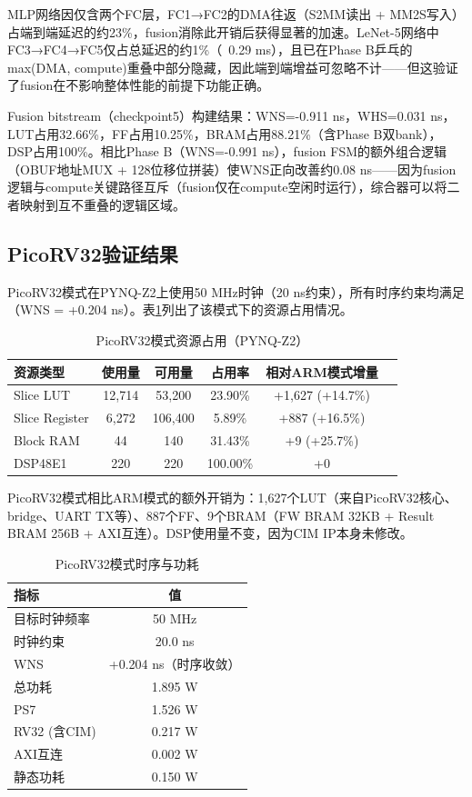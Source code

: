 \documentclass[12pt, a4paper]{article}
\begin{document}
MLP网络因仅含两个FC层，FC1→FC2的DMA往返（S2MM读出 + MM2S写入）占端到端延迟的约23\%，fusion消除此开销后获得显著的加速。LeNet-5网络中FC3→FC4→FC5仅占总延迟的约1\%（~0.29 ms），且已在Phase B乒乓的max(DMA, compute)重叠中部分隐藏，因此端到端增益可忽略不计——但这验证了fusion在不影响整体性能的前提下功能正确。

Fusion bitstream（checkpoint5）构建结果：WNS=-0.911 ns，WHS=0.031 ns，LUT占用32.66\%，FF占用10.25\%，BRAM占用88.21\%（含Phase B双bank），DSP占用100\%。相比Phase B（WNS=-0.991 ns），fusion FSM的额外组合逻辑（OBUF地址MUX + 128位移位拼装）使WNS正向改善约0.08 ns——因为fusion逻辑与compute关键路径互斥（fusion仅在compute空闲时运行），综合器可以将二者映射到互不重叠的逻辑区域。

\subsection{PicoRV32验证结果}

PicoRV32模式在PYNQ-Z2上使用50 MHz时钟（20 ns约束），所有时序约束均满足（WNS = +0.204 ns）。表\ref{tab:util_rv32}列出了该模式下的资源占用情况。

\begin{table}[H]
	\centering
	\caption{PicoRV32模式资源占用（PYNQ-Z2）}
	\begin{tabular}{lccccc}
		\toprule
		资源类型 & 使用量 & 可用量 & 占用率 & 相对ARM模式增量 \\
		\midrule
		Slice LUT & 12,714 & 53,200 & 23.90\% & +1,627 (+14.7\%) \\
		Slice Register & 6,272 & 106,400 & 5.89\% & +887 (+16.5\%) \\
		Block RAM & 44 & 140 & 31.43\% & +9 (+25.7\%) \\
		DSP48E1 & 220 & 220 & 100.00\% & +0 \\
		\bottomrule
	\end{tabular}
	\label{tab:util_rv32}
\end{table}

PicoRV32模式相比ARM模式的额外开销为：1,627个LUT（来自PicoRV32核心、bridge、UART TX等）、887个FF、9个BRAM（FW BRAM 32KB + Result BRAM 256B + AXI互连）。DSP使用量不变，因为CIM IP本身未修改。

\begin{table}[H]
	\centering
	\caption{PicoRV32模式时序与功耗}
	\begin{tabular}{lc}
		\toprule
		指标 & 值 \\
		\midrule
		目标时钟频率 & 50 MHz \\
		时钟约束 & 20.0 ns \\
		WNS & +0.204 ns（时序收敛） \\
		总功耗 & 1.895 W \\
		\quad PS7 & 1.526 W \\
		\quad RV32 (含CIM) & 0.217 W \\
		\quad AXI互连 & 0.002 W \\
		\quad 静态功耗 & 0.150 W \\
		\bottomrule
	\end{tabular}
\end{table}
\end{document}
